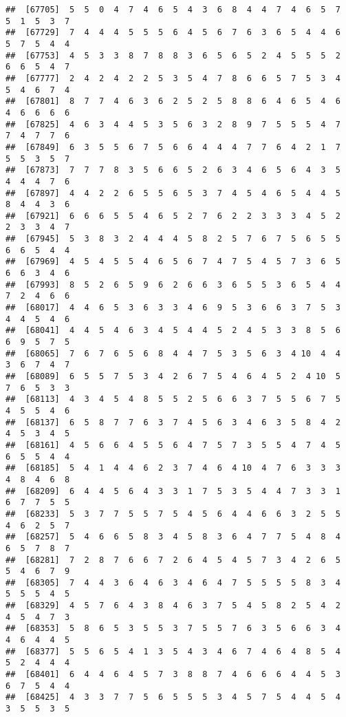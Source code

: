 \documentclass[
]{book}
\begin{document}
\begin{verbatim}
##  [67705]  5  5  0  4  7  4  6  5  4  3  6  8  4  4  7  4  6  5  7  5  1  5  3  7
##  [67729]  7  4  4  4  5  5  5  6  4  5  6  7  6  3  6  5  4  4  6  5  7  5  4  4
##  [67753]  4  5  3  3  8  7  8  8  3  6  5  6  5  2  4  5  5  5  2  6  6  5  4  7
##  [67777]  2  4  2  4  2  2  5  3  5  4  7  8  6  6  5  7  5  3  4  5  4  6  7  4
##  [67801]  8  7  7  4  6  3  6  2  5  2  5  8  8  6  4  6  5  4  6  4  6  6  6  6
##  [67825]  4  6  3  4  4  5  3  5  6  3  2  8  9  7  5  5  5  4  7  7  4  7  7  6
##  [67849]  6  3  5  5  6  7  5  6  6  4  4  4  7  7  6  4  2  1  7  5  5  3  5  7
##  [67873]  7  7  7  8  3  5  6  6  5  2  6  3  4  6  5  6  4  3  5  4  4  4  7  6
##  [67897]  4  4  2  2  6  5  5  6  5  3  7  4  5  4  6  5  4  4  5  8  4  4  3  6
##  [67921]  6  6  6  5  5  4  6  5  2  7  6  2  2  3  3  3  4  5  2  2  3  3  4  7
##  [67945]  5  3  8  3  2  4  4  4  5  8  2  5  7  6  7  5  6  5  5  6  6  5  4  4
##  [67969]  4  5  4  5  5  4  6  5  6  7  4  7  5  4  5  7  3  6  5  6  6  3  4  6
##  [67993]  8  5  2  6  5  9  6  2  6  6  3  6  5  5  3  6  5  4  4  7  2  4  6  6
##  [68017]  4  4  6  5  3  6  3  3  4  6  9  5  3  6  6  3  7  5  3  4  4  5  4  6
##  [68041]  4  4  5  4  6  3  4  5  4  4  5  2  4  5  3  3  8  5  6  6  9  5  7  5
##  [68065]  7  6  7  6  5  6  8  4  4  7  5  3  5  6  3  4 10  4  4  3  6  7  4  7
##  [68089]  6  5  5  7  5  3  4  2  6  7  5  4  6  4  5  2  4 10  5  7  6  5  3  3
##  [68113]  4  3  4  5  4  8  5  5  2  5  6  6  3  7  5  5  6  7  5  4  5  5  4  6
##  [68137]  6  5  8  7  7  6  3  7  4  5  6  3  4  6  3  5  8  4  2  4  5  3  4  5
##  [68161]  4  5  6  6  4  5  5  6  4  7  5  7  3  5  5  4  7  4  5  6  5  5  4  4
##  [68185]  5  4  1  4  4  6  2  3  7  4  6  4 10  4  7  6  3  3  3  4  8  4  6  8
##  [68209]  6  4  4  5  6  4  3  3  1  7  5  3  5  4  4  7  3  3  1  6  7  7  5  5
##  [68233]  5  3  7  7  5  5  7  5  4  5  6  4  4  6  6  3  2  5  5  4  6  2  5  7
##  [68257]  5  4  6  6  5  8  3  4  5  8  3  6  4  7  7  5  4  8  4  6  5  7  8  7
##  [68281]  7  2  8  7  6  6  7  2  6  4  5  4  5  7  3  4  2  6  5  5  4  6  7  9
##  [68305]  7  4  4  3  6  4  6  3  4  6  4  7  5  5  5  5  8  3  4  5  5  5  4  5
##  [68329]  4  5  7  6  4  3  8  4  6  3  7  5  4  5  8  2  5  4  2  4  5  4  7  3
##  [68353]  5  8  6  5  3  5  5  3  7  5  5  7  6  3  5  6  6  3  4  4  6  4  4  5
##  [68377]  5  5  6  5  4  1  3  5  4  3  4  6  7  4  6  4  8  5  4  5  2  4  4  4
##  [68401]  6  4  4  6  4  5  7  3  8  8  7  4  6  6  6  4  4  5  3  6  7  5  4  4
##  [68425]  4  3  3  7  7  5  6  5  5  5  3  4  5  7  5  4  4  5  4  3  5  5  3  5

\end{verbatim}
\end{document}
